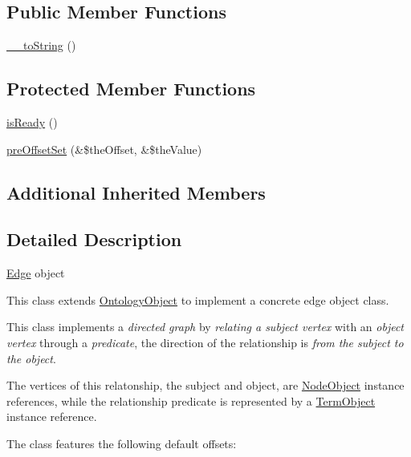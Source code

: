 \subsection*{Public Member Functions}
\begin{DoxyCompactItemize}
\item 
\hyperlink{class_ontology_wrapper_1_1_edge_object_a84be7c8553b0b6b1c475e0b649a12d8c}{\-\_\-\-\_\-to\-String} ()
\end{DoxyCompactItemize}
\subsection*{Protected Member Functions}
\begin{DoxyCompactItemize}
\item 
\hyperlink{class_ontology_wrapper_1_1_edge_object_a5aa82167fe007847ae2aaf91f8216550}{is\-Ready} ()
\item 
\hyperlink{class_ontology_wrapper_1_1_edge_object_a3fd5fb40d4f02604ebfab4a1633676d0}{pre\-Offset\-Set} (\&\$the\-Offset, \&\$the\-Value)
\end{DoxyCompactItemize}
\subsection*{Additional Inherited Members}


\subsection{Detailed Description}
\hyperlink{class_ontology_wrapper_1_1_edge}{Edge} object

This class extends \hyperlink{class_ontology_wrapper_1_1_ontology_object}{Ontology\-Object} to implement a concrete edge object class.

This class implements a {\itshape directed graph} by {\itshape relating a subject vertex} with an {\itshape object vertex} through a {\itshape predicate}, the direction of the relationship is {\itshape from the subject to the object}.

The vertices of this relatonship, the subject and object, are \hyperlink{class_ontology_wrapper_1_1_node_object}{Node\-Object} instance references, while the relationship predicate is represented by a \hyperlink{class_ontology_wrapper_1_1_term_object}{Term\-Object} instance reference.

The class features the following default offsets\-:


